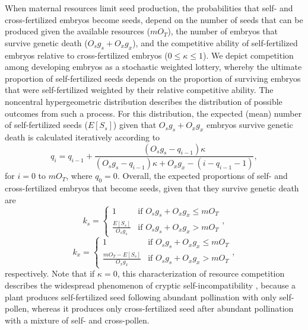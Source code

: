 \documentclass[letterpaper,titlepage]{scrartcl}
\begin{document}
When maternal resources limit seed production, the probabilities that
self- and cross-fertilized embryos become seeds, depend on the number
of seeds that can be produced given the available resources
($mO_{T}$), the number of embryos that survive genetic death
($O_{s}g_{s}+O_{x}g_{x}$), and the competitive ability of
self-fertilized embryos relative to cross-fertilized embryos ($0\leq
\kappa \leq 1$). We depict competition among developing embryos as a
stochastic weighted lottery, whereby the ultimate proportion of
self-fertilized seeds depends on the proportion of surviving embryos
that were self-fertilized weighted by their relative competitive
ability. The noncentral hypergeometric distribution \citep{Chesson76}
describes the distribution of possible outcomes from such a
process. For this distribution, the expected (mean) number of
self-fertilized seeds ($E[S_{s}]$) given that $O_{s}g_{s}+O_{x}g_{x}$
embryos survive genetic death is calculated iteratively according to
\begin{equation*}
  q_{i}=q_{i-1}+\frac{(O_{s}g_{s}-q_{i-1})\kappa}{(O_{s}g_{s}-q_{i-1})\kappa +O_{x}g_{x}-(i-q_{i-1}-1)},
\end{equation*}
for $i=0$ to $mO_{T}$, where $q_{0}=0$. Overall, the expected
proportions of self- and cross-fertilized embryos that become seeds,
given that they survive genetic death are
\begin{equation*}
  k_{s}=
  \begin{cases}
    1 & \text{if } O_{s}g_{s}+O_{x}g_{x}\leq mO_{T}\\
    \frac{E[S_{s}]}{O_{s}g_{s}} & \text{if }
    O_{s}g_{s}+O_{x}g_{x}>mO_{T}
  \end{cases},
\end{equation*}
\begin{equation*}
  k_{x}=
  \begin{cases}
    1 & \text{if } O_{s}g_{s}+O_{x}g_{x}\leq mO_{T}\\
    \frac{mO_{T}-E[S_{s}]}{O_{x}g_{x}} &\text{if }
    O_{s}g_{s}+O_{x}g_{x}>mO_{T}
  \end{cases},
\end{equation*}
respectively. Note that if $\kappa =0$, this characterization of
resource competition describes the widespread phenomenon of cryptic
self-incompatibility \citep{Bertin89,Cruzan93,Rigney93,Eckert97},
because a plant produces self-fertilized seed following abundant
pollination with only self-pollen, whereas it produces only
cross-fertilized seed after abundant pollination with a mixture of
self- and cross-pollen.
\end{document}
